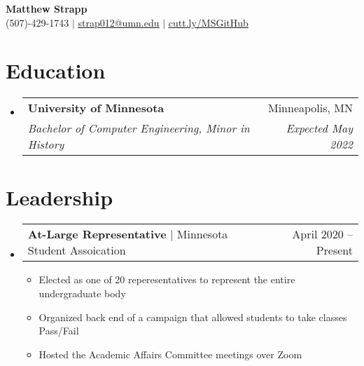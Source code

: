\documentclass[letterpaper,11pt]{article}
\makeatletter
\newcommand{\resumeItem}[1]{
  \item\small{
    {#1 \vspace{-2pt}}
  }
}
\newcommand{\resumeSubheading}[4]{
  \vspace{-2pt}\item
    \begin{tabular*}{0.97\textwidth}[t]{l@{\extracolsep{\fill}}r}
      \textbf{#1} & #2 \\
      \textit{\small#3} & \textit{\small #4} \\
    \end{tabular*}\vspace{-7pt}
}
\newcommand{\resumeSubSubheading}[2]{
    \item
    \begin{tabular*}{0.97\textwidth}{l@{\extracolsep{\fill}}r}
      \textit{\small#1} & \textit{\small #2} \\
    \end{tabular*}\vspace{-7pt}
}
\newcommand{\resumeProjectHeading}[2]{
    \item
    \begin{tabular*}{0.97\textwidth}{l@{\extracolsep{\fill}}r}
      \small#1 & #2 \\
    \end{tabular*}\vspace{-7pt}
}
\newcommand{\resumeSubItem}[1]{\resumeItem{#1}\vspace{-4pt}}
\newcommand{\resumeSubHeadingListStart}{\begin{itemize}[leftmargin=0.15in, label={}]}
\newcommand{\resumeSubHeadingListEnd}{\end{itemize}}
\newcommand{\resumeItemListStart}{\begin{itemize}}
\newcommand{\resumeItemListEnd}{\end{itemize}\vspace{-5pt}}
\makeatother
\begin{document}

\begin{center}
    \textbf{\Huge Matthew Strapp} \\ \vspace{1pt}
    \small (507)-429-1743 $|$ \href{mailto:strap012@umn.edu}{\underline{strap012@umn.edu}} $|$ 
    \href{https://cutt.ly/MSGitHub}{\underline{cutt.ly/MSGitHub}}
\end{center}


\section{Education}
  \resumeSubHeadingListStart
    \resumeSubheading
      {University of Minnesota}{Minneapolis, MN}
      {Bachelor of Computer Engineering, Minor in History}{Expected May 2022}
  \resumeSubHeadingListEnd

\section{Leadership}
    \resumeSubHeadingListStart
        \resumeProjectHeading 
            {\textbf{At-Large Representative} $|$ Minnesota Student Assoication}{April 2020 -- Present}
        \resumeItemListStart
            \resumeItem{Elected as one of 20 reperesentatives to represent the entire undergraduate body}
            \resumeItem{Organized back end of a campaign that allowed students to take classes Pass/Fail}
            \resumeItem{Hosted the Academic Affairs Committee meetings over Zoom}
        \resumeItemListEnd
    \resumeSubHeadingListEnd

\end{document}
